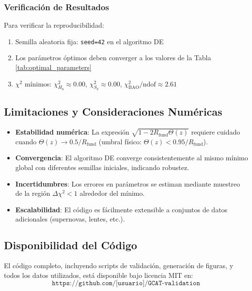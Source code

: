 \documentclass[12pt, a4paper]{article}
\theoremstyle{plain}
\theoremstyle{definition}
\begin{document}
\subsubsection{Verificación de Resultados}
Para verificar la reproducibilidad:
\begin{enumerate}
    \item Semilla aleatoria fija: \texttt{seed=42} en el algoritmo DE
    \item Los parámetros óptimos deben converger a los valores de la Tabla \ref{tab:optimal_parameters}
    \item $\chi^2$ mínimos: $\chi^2_{H_0} \approx 0.00$, $\chi^2_{S_8} \approx 0.00$, $\chi^2_{\text{BAO}}/\text{ndof} \approx 2.61$
\end{enumerate}

\subsection{Limitaciones y Consideraciones Numéricas}

\begin{itemize}
    \item \textbf{Estabilidad numérica}: La expresión $\sqrt{1 - 2R_{\text{fund}}\Theta(z)}$ requiere cuidado cuando $\Theta(z) \to 0.5/R_{\text{fund}}$ (umbral físico: $\Theta(z) < 0.95/R_{\text{fund}}$).
    
    \item \textbf{Convergencia}: El algoritmo DE converge consistentemente al mismo mínimo global con diferentes semillas iniciales, indicando robustez.
    
    \item \textbf{Incertidumbres}: Los errores en parámetros se estiman mediante muestreo de la región $\Delta\chi^2 < 1$ alrededor del mínimo.
    
    \item \textbf{Escalabilidad}: El código es fácilmente extensible a conjuntos de datos adicionales (supernovas, lentes, etc.).
\end{itemize}

\subsection{Disponibilidad del Código}

El código completo, incluyendo scripts de validación, generación de figuras, y todos los datos utilizados, está disponible bajo licencia MIT en:
\[
\boxed{\texttt{https://github.com/[usuario]/GCAT-validation}}
\]
\end{document}
